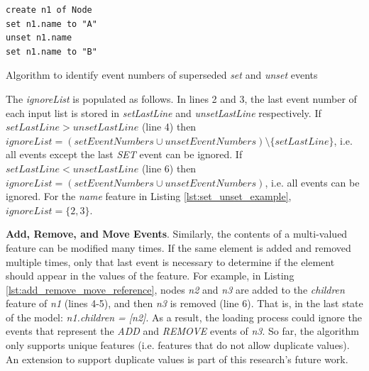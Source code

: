 \documentclass[12pt, a4paper]{report} \usepackage[titletoc]{appendix}
\begin{document}
\begin{lstlisting}[style=eol,caption={The change-based persistence representation of attribute \emph{name} assignments.},label=lst:set_unset_example]
create n1 of Node
set n1.name to "A"
unset n1.name
set n1.name to "B"
\end{lstlisting}

\begin{algorithm}[H]
	\begin{small}
	\end{small}
	\caption{Algorithm to identify event numbers of superseded \emph{set} and \emph{unset} events}
	\label{alg:set_unset_optimisation}
\end{algorithm}

The \emph{ignoreList} is populated as follows.
In lines 2 and 3, the last event number of each input list is stored in \emph{setLastLine} and \emph{unsetLastLine} respectively. If $setLastLine > unsetLastLine$ (line 4) then $ignoreList = (setEventNumbers \cup unsetEventNumbers) \setminus  \{setLastLine\} $, i.e. all events except the last \emph{SET} event can be ignored. If $setLastLine < unsetLastLine$ (line 6) then $ignoreList = (setEventNumbers \cup unsetEventNumbers)$, i.e. all events can be ignored. For the \emph{name} feature in Listing \ref{lst:set_unset_example}, $ignoreList = \{2, 3\}$.

\textbf{Add, Remove, and Move Events}\label{subsec:add_remove_and_move_operations}. Similarly, the contents of a multi-valued feature can be modified many times. If the same element is added and removed multiple times,  only that last event is necessary to determine if the element should appear in the values of the feature. For example, in Listing \ref{lst:add_remove_move_reference},  nodes \emph{n2} and \emph{n3} are added to the \emph{children} feature of \emph{n1} (lines 4-5), and then \emph{n3} is removed (line 6). That is, in the last state of the model: \emph{n1.children = [n2]}. As a result, the loading process could ignore the events that represent the \emph{ADD} and \emph{REMOVE} events of \emph{n3}. So far, the algorithm only supports unique features (i.e. features that do not allow duplicate values). An extension to support duplicate values is part of this research's future work. 
\end{document}
